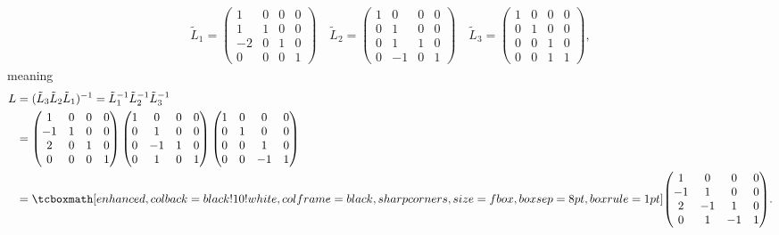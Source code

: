 \begin{eqnarray}
    \label{eq:L-mats}
    \tilde{L}_1 = 
    \begin{pmatrix}
        1 & 0 & 0 & 0 \\
        1 & 1 & 0 & 0 \\
        -2 & 0 & 1 & 0 \\
        0 & 0 & 0 & 1
    \end{pmatrix}
    \quad
    \tilde{L}_{2} = 
    \begin{pmatrix}
        1 & 0 & 0 & 0 \\
        0 & 1 & 0 & 0 \\
        0 & 1 & 1 & 0 \\
        0 & -1 & 0 & 1 
    \end{pmatrix}
    \quad
    \tilde{L}_{3} = 
    \begin{pmatrix}
        1 & 0 & 0 & 0 \\
        0 & 1 & 0 & 0 \\
        0 & 0 & 1 & 0 \\
        0 & 0 & 1 & 1 
    \end{pmatrix}
,\end{eqnarray}
meaning
\begin{align}
    \label{eq:L-from-123}
    L &= (\tilde{L}_{3}\tilde{L}_{2}\tilde{L}_{1})^{-1} = \tilde{L}_{1}^{-1} \tilde{L}_{2}^{-1} \tilde{L}_{3}^{-1} \\
    &=
    \begin{pmatrix}
        1 & 0 & 0 & 0 \\
        -1 & 1 & 0 & 0 \\
        2 & 0 & 1 & 0 \\
        0 & 0 & 0 & 1 
    \end{pmatrix}
    \begin{pmatrix}
        1 & 0 & 0 & 0 \\
        0 & 1 & 0 & 0 \\
        0 & -1 & 1 & 0 \\
        0 & 1 & 0 & 1 
    \end{pmatrix}
    \begin{pmatrix}
        1 & 0 & 0 & 0 \\
        0 & 1 & 0 & 0 \\
        0 & 0 & 1 & 0 \\
        0 & 0 & -1 & 1
    \end{pmatrix} \\
    &= 
    \eqbox{
    \begin{pmatrix}
        1 & 0 & 0 & 0 \\
        -1 & 1 & 0 & 0 \\
        2 & -1 & 1 & 0 \\
        0 & 1 & -1 & 1
    \end{pmatrix}
}
.\end{align}
